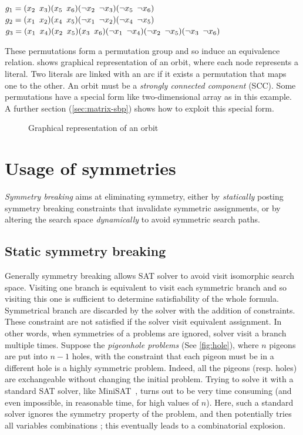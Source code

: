 \begin{center}
 \begin{minipage}[c]{.635\textwidth}
  $g_1 = (x_2 \enskip x_3)(x_5 \enskip x_6)(\neg x_2 \enskip \neg x_3)(\neg x_5 \enskip \neg x_6)$\\
  $g_2 = (x_1 \enskip x_2)(x_4 \enskip x_5)(\neg x_1 \enskip \neg x_2)(\neg x_4 \enskip \neg x_5)$\\
  $g_3 = (x_1 \enskip x_4)(x_2 \enskip x_5)(x_3 \enskip x_6)(\neg x_1 \enskip \neg x_4)(\neg x_2 \enskip \neg x_5)(\neg x_3 \enskip \neg x_6)$
 \end{minipage}
\end{center}

These permutations form a permutation group and so induce an equivalence relation.
 shows graphical representation of an orbit, where each node represents a literal.
Two literals are linked with an arc if it exists a permutation that maps one to the other. 
An orbit must be a \emph{strongly connected component} (SCC).  
Some permutations have a special form like two-dimensional
array as in this example.
 A further section (\ref{sec:matrix-sbp}) shows how to exploit this special form.
\begin{figure}[!htbp]
 
 \caption{Graphical representation of an orbit}
 \label{fig:orbit}
\end{figure}

\section{Usage of symmetries}
\emph{Symmetry breaking} aims at eliminating symmetry, either
by \emph{statically} posting symmetry breaking constraints that invalidate symmetric
assignments, or by altering the search space \emph{dynamically} to avoid symmetric search paths.

\subsection{Static symmetry breaking}

Generally symmetry breaking allows SAT solver to avoid visit isomorphic search space.
Visiting one branch is equivalent to visit each symmetric branch and so visiting this one is sufficient to 
determine satisfiability of the whole formula. Symmetrical branch are discarded by the solver with the addition of 
constraints. These constraint are not satisfied if the solver visit equivalent assignment.
In other words, when symmetries of a problems are ignored, solver visit a branch multiple times.
Suppose the \textit{pigeonhole problems} (See \cref{fig:hole}), where $n$ pigeons are put into $n-1$
holes, with the constraint that each pigeon must be in a different hole is a
highly symmetric problem. Indeed, all the pigeons (resp. holes) are exchangeable
without changing the initial problem. Trying to solve it with a standard SAT
solver, like MiniSAT~\cite{een2003extensible}, turns out to be very time
consuming (and even impossible, in reasonable time, for high values of $n$).
Here, such a standard solver ignores the symmetry property of the problem, and
then potentially tries all variables combinations ; this eventually leads to
a combinatorial explosion.


